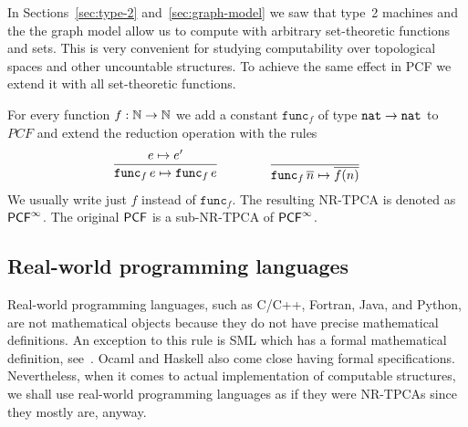 In Sections~\ref{sec:type-2} and~\ref{sec:graph-model} we saw that
type~2 machines and the the graph model allow us to compute with
arbitrary set-theoretic functions and sets. This is very convenient
for studying computability over topological spaces and other
uncountable structures. To achieve the same effect in PCF we extend it
with all set-theoretic functions.

For every function $f : \mathbb{N} \to \mathbb{N}$ we add a constant
$\mathtt{func}_f$ of type $\mathtt{nat} \to \mathtt{nat}$ to $PCF$ and extend the
reduction operation with the rules
%
\begin{equation*}
  \begin{gathered}\dfrac{e \mapsto e'}{\mathtt{func}_f\,e \mapsto \mathtt{func}_f\,e}\end{gathered}
  \qquad\qquad
  \dfrac{}{\mathtt{func}_f\,\overline{n} \mapsto \overline{f(n)}}
\end{equation*}
%
We usually write just $f$ instead of $\mathtt{func}_f$. The resulting
NR-TPCA is denoted as $\mathsf{PCF}^\infty$. The original $\mathsf{PCF}$ is a sub-NR-TPCA
of $\mathsf{PCF}^\infty$.


\subsection{Real-world programming languages}
\label{sec:programming-languages}

Real-world programming languages, such as C/C++, Fortran, Java, and
Python, are not mathematical objects because they do not have precise
mathematical definitions. An exception to this rule is SML which has a
formal mathematical definition, see~\cite{MilnerR:defsml}. Ocaml and
Haskell also come close having formal specifications. Nevertheless,
when it comes to actual implementation of computable structures, we
shall use real-world programming languages as if they were NR-TPCAs
since they mostly are, anyway.


